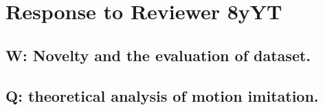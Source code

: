 \documentclass{article}
\begin{document}





\section{Response to Reviewer 8yYT}

\subsection{W: Novelty and the evaluation of dataset.}

\subsection{Q: theoretical analysis of motion imitation.} 









\end{document}
